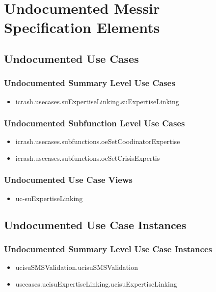 	
\chapter{Undocumented Messir Specification Elements}


\section[Undocumented Use Cases]{Undocumented Use Cases}

\subsection[Undocumented Use Cases - Summary Level]{Undocumented Summary Level Use Cases}
\begin{itemize}
\item icrash.usecases.suExpertiseLinking.suExpertiseLinking 
\end{itemize}


\subsection[Undocumented Use Cases - Subfunction Level]{Undocumented Subfunction Level Use Cases}
\begin{itemize}
\item icrash.usecases.subfunctions.oeSetCoodinatorExpertise 
\item icrash.usecases.subfunctions.oeSetCrisisExpertis 
\end{itemize}

\subsection[Undocumented Use Case Views]{Undocumented Use Case Views}
\begin{itemize}
\item uc-suExpertiseLinking 
\end{itemize}




\section[Undocumented Use Case Instances]{Undocumented Use Case Instances}

\subsection[Undocumented Use Case Instances - Summary Level]{Undocumented Summary Level Use Case Instances}
\begin{itemize}
\item ucisuSMSValidation.ucisuSMSValidation 
\item usecases.ucisuExpertiseLinking.ucisuExpertiseLinking 
\end{itemize}

